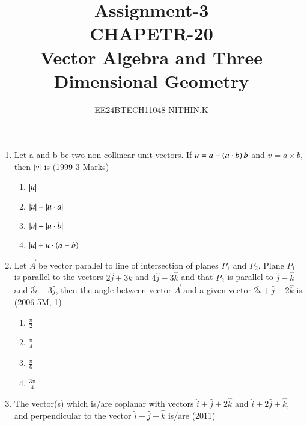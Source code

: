 \documentclass[journal]{IEEEtran}
\numberwithin{equation}{enumi}
\numberwithin{figure}{enumi}
\begin{document}


\title{Assignment-3 \\ CHAPETR-20 \\ Vector Algebra and Three Dimensional Geometry}
\author{EE24BTECH11048-NITHIN.K}
{\let\newpage\relax\maketitle}

\begin{enumerate}
\section{D:MCQs with One or More than One Correct}
	\item Let a and b be two non-collinear unit vectors. If $u=a-\left(a\cdot b\right)b$ and $v=a\times b$, then $\left\vert v\right\vert$ is \hfill{(1999-3 Marks)}
		\begin{enumerate}
			\item $\left\vert u\right\vert$
			\item $\left\vert u\right\vert + \left\vert u \cdot a\right\vert$
			\item $\left\vert u\right\vert + \left\vert u \cdot b\right\vert$
			\item $\left\vert u\right\vert +  u\cdot\left(a+b\right)$
		\end{enumerate}
	\item Let $\vec{A}$ be vector parallel to line of intersection of planes $P_1$ and $P_2$. Plane $P_1$ is parallel to the vectors $2\hat{j}+3\hat{k}$ and $4\hat{j}-3\hat{k}$ and that $P_2$ is
		parallel to $\hat{j}-\hat{k}$ and $3\hat{i}+3\hat{j}$, then the angle between vector $\vec{A}$ and a given vector $2\hat{i}+\hat{j}-2\hat{k}$ is \hfill{(2006-5M,-1)}
		\begin{enumerate}
			\item $\frac{\pi}{2}$
			\item $\frac{\pi}{4}$
			\item $\frac{\pi}{6}$
			\item $\frac{3\pi}{4}$
		\end{enumerate}
	\item The vector(s) which is/are coplanar with vectors $\hat{i}+\hat{j}+2\hat{k}$ and $\hat{i}+2\hat{j}+\hat{k}$, and perpendicular to the vector $\hat{i}+\hat{j}+\hat{k}$ is/are \hfill{(2011)}
		\begin{enumerate}

\end{enumerate}
\end{enumerate}
\end{document}
